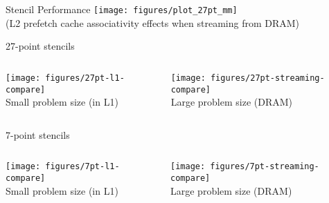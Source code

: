 \begin{frame}{Stencil Performance}
  \centering
  \texttt{[image: figures/plot\_27pt\_mm]} \\
  (L2 prefetch cache associativity effects when streaming from DRAM)
\end{frame}

\begin{frame}{27-point stencils}
  \begin{columns}
    \begin{column}{0.5\textwidth}
      \texttt{[image: figures/27pt-l1-compare]} \\
      Small problem size (in L1)
    \end{column}
    \begin{column}{0.5\textwidth}
      \texttt{[image: figures/27pt-streaming-compare]} \\
      Large problem size (DRAM)
    \end{column}
  \end{columns}
\end{frame}

\begin{frame}{7-point stencils}
  \begin{columns}
    \begin{column}{0.5\textwidth}
      \texttt{[image: figures/7pt-l1-compare]} \\
      Small problem size (in L1)
    \end{column}
    \begin{column}{0.5\textwidth}
      \texttt{[image: figures/7pt-streaming-compare]} \\
      Large problem size (DRAM)
    \end{column}
  \end{columns}
\end{frame}
